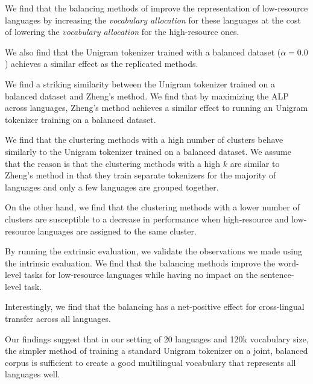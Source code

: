 
We find that the balancing methods of \citet{chung_improving_2020,zheng_allocating_2021,liang_xlm-v_2023} improve the representation of low-resource languages by increasing the \textit{vocabulary allocation} for these languages at the cost of lowering the \textit{vocabulary allocation} for the high-resource ones. 

We also find that the Unigram tokenizer trained with a balanced dataset ($\alpha=0.0$) achieves a similar effect as the replicated methods. 

We find a striking similarity between the Unigram tokenizer trained on a balanced dataset and Zheng's method. We find that by maximizing the ALP across languages, Zheng's method achieves a similar effect to running an Unigram tokenizer training on a balanced dataset.

We find that the clustering methods with a high number of clusters behave similarly to the Unigram tokenizer trained on a balanced dataset. We assume that the reason is that the clustering methods with a high $k$ are similar to Zheng's method in that they train separate tokenizers for the majority of languages and only a few languages are grouped together.

On the other hand, we find that the clustering methods with a lower number of clusters are susceptible to a decrease in performance when high-resource and low-resource languages are assigned to the same cluster.

By running the extrinsic evaluation, we validate the observations we made using the intrinsic evaluation. We find that the balancing methods improve the word-level tasks for low-resource languages while having no impact on the sentence-level task. 

Interestingly, we find that the balancing has a net-positive effect for cross-lingual transfer across all languages.

Our findings suggest that in our  setting of 20 languages and 120k vocabulary size, the simpler method of training a standard Unigram tokenizer on a joint, balanced corpus is sufficient to create a good multilingual vocabulary that represents all languages well.

